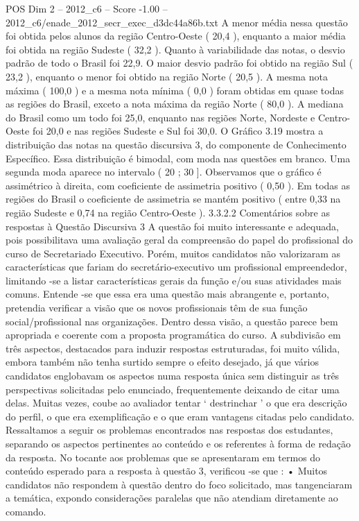 \begin{textsample}{POS Dim 2 – 2012\_c6 – Score -1.00 – 2012\_c6/enade\_2012\_secr\_exec\_d3dc44a86b.txt}
A menor média nessa questão foi obtida pelos alunos da região Centro-Oeste ( 20,4 ), enquanto a maior média foi obtida na região Sudeste ( 32,2 ).
Quanto à variabilidade das notas, o desvio padrão de todo o Brasil foi 22,9.
O maior desvio padrão foi obtido na região Sul ( 23,2 ), enquanto o menor foi obtido na região Norte ( 20,5 ).
A mesma nota máxima ( 100,0 ) e a mesma nota mínima ( 0,0 ) foram obtidas em quase todas as regiões do Brasil, exceto a nota máxima da região Norte ( 80,0 ).
A mediana do Brasil como um todo foi 25,0, enquanto nas regiões Norte, Nordeste e Centro-Oeste foi 20,0 e nas regiões Sudeste e Sul foi 30,0.
O Gráfico 3.19 mostra a distribuição das notas na questão discursiva 3, do componente de Conhecimento Específico.
Essa distribuição é bimodal, com moda nas questões em branco.
Uma segunda moda aparece no intervalo ( 20 ; 30 ].
Observamos que o gráfico é assimétrico à direita, com coeficiente de assimetria positivo ( 0,50 ).
Em todas as regiões do Brasil o coeficiente de assimetria se mantém positivo ( entre 0,33 na região Sudeste e 0,74 na região Centro-Oeste ). 3.3.2.2 Comentários sobre as respostas à Questão Discursiva 3 A questão foi muito interessante e adequada, pois possibilitava uma avaliação geral da compreensão do papel do profissional do curso de Secretariado Executivo.
Porém, muitos candidatos não valorizaram as características que fariam do secretário-executivo um profissional empreendedor, limitando -se a listar características gerais da função e/ou suas atividades mais comuns.
Entende -se que essa era uma questão mais abrangente e, portanto, pretendia verificar a visão que os novos profissionais têm de sua função social/profissional nas organizações.
Dentro dessa visão, a questão parece bem apropriada e coerente com a proposta programática do curso.
A subdivisão em três aspectos, destacados para induzir respostas estruturadas, foi muito válida, embora também não tenha surtido sempre o efeito desejado, já que vários candidatos englobavam os aspectos numa resposta única sem distinguir as três perspectivas solicitadas pelo enunciado, frequentemente deixando de citar uma delas.
Muitas vezes, coube ao avaliador tentar ‘ destrinchar ’ o que era descrição do perfil, o que era exemplificação e o que eram vantagens citadas pelo candidato.
Ressaltamos a seguir os problemas encontrados nas respostas dos estudantes, separando os aspectos pertinentes ao conteúdo e os referentes à forma de redação da resposta.
No tocante aos problemas que se apresentaram em termos do conteúdo esperado para a resposta à questão 3, verificou -se que : • Muitos candidatos não respondem à questão dentro do foco solicitado, mas tangenciaram a temática, expondo considerações paralelas que não atendiam diretamente ao comando.

\end{textsample}
